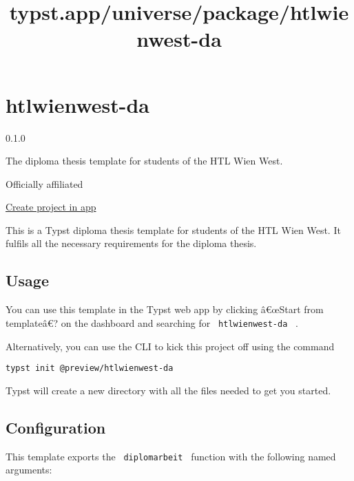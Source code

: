 \title{typst.app/universe/package/htlwienwest-da}

\label{banner}
\label{template-thumbnail}

\section{htlwienwest-da}\label{htlwienwest-da}

{ 0.1.0 }

The diploma thesis template for students of the HTL Wien West.

{ } Officially affiliated

\href{/app?template=htlwienwest-da&version=0.1.0}{Create project in app}

\label{readme}
This is a Typst diploma thesis template for students of the HTL Wien
West. It fulfils all the necessary requirements for the diploma thesis.

\subsection{Usage}\label{usage}

You can use this template in the Typst web app by clicking â€œStart from
templateâ€? on the dashboard and searching for
\texttt{\ htlwienwest-da\ } .

Alternatively, you can use the CLI to kick this project off using the
command

\begin{verbatim}
typst init @preview/htlwienwest-da
\end{verbatim}

Typst will create a new directory with all the files needed to get you
started.

\subsection{Configuration}\label{configuration}

This template exports the \texttt{\ diplomarbeit\ } function with the
following named arguments:

